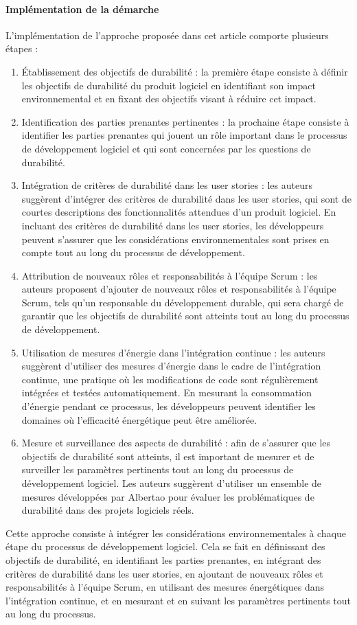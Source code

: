 \paragraph{Implémentation de la démarche}
L'implémentation de l'approche proposée dans cet article comporte plusieurs étapes :
\begin{enumerate}
    \item Établissement des objectifs de durabilité : la première étape consiste à définir les objectifs de durabilité du produit logiciel en identifiant son impact environnemental et en fixant des objectifs visant à réduire cet impact.
    \item Identification des parties prenantes pertinentes : la prochaine étape consiste à identifier les parties prenantes qui jouent un rôle important dans le processus de développement logiciel et qui sont concernées par les questions de durabilité.
    \item Intégration de critères de durabilité dans les user stories : les auteurs suggèrent d'intégrer des critères de durabilité dans les user stories, qui sont de courtes descriptions des fonctionnalités attendues d'un produit logiciel. En incluant des critères de durabilité dans les user stories, les développeurs peuvent s'assurer que les considérations environnementales sont prises en compte tout au long du processus de développement.
    \item Attribution de nouveaux rôles et responsabilités à l'équipe Scrum : les auteurs proposent d'ajouter de nouveaux rôles et responsabilités à l'équipe Scrum, tels qu'un responsable du développement durable, qui sera chargé de garantir que les objectifs de durabilité sont atteints tout au long du processus de développement.
    \item Utilisation de mesures d'énergie dans l'intégration continue : les auteurs suggèrent d'utiliser des mesures d'énergie dans le cadre de l'intégration continue, une pratique où les modifications de code sont régulièrement intégrées et testées automatiquement. En mesurant la consommation d'énergie pendant ce processus, les développeurs peuvent identifier les domaines où l'efficacité énergétique peut être améliorée.
    \item Mesure et surveillance des aspects de durabilité : afin de s'assurer que les objectifs de durabilité sont atteints, il est important de mesurer et de surveiller les paramètres pertinents tout au long du processus de développement logiciel. Les auteurs suggèrent d'utiliser un ensemble de mesures développées par Albertao \cite{Albertao} pour évaluer les problématiques de durabilité dans des projets logiciels réels.
\end{enumerate}
Cette approche consiste à intégrer les considérations environnementales à chaque étape du processus de développement logiciel. Cela se fait en définissant des objectifs de durabilité, en identifiant les parties prenantes, en intégrant des critères de durabilité dans les user stories, en ajoutant de nouveaux rôles et responsabilités à l'équipe Scrum, en utilisant des mesures énergétiques dans l'intégration continue, et en mesurant et en suivant les paramètres pertinents tout au long du processus.

